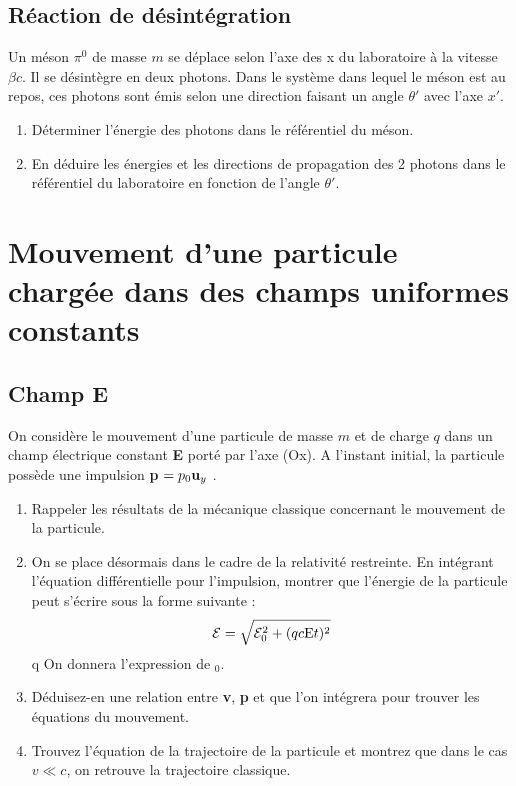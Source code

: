 \subsection{Réaction de désintégration}%
Un méson  $\pi^0$ de masse $m$ se déplace selon l’axe des x du laboratoire à la vitesse $\beta c$. Il se
désintègre en deux photons. Dans le système dans lequel le méson est au repos, ces photons
sont émis selon une direction faisant un angle $\theta'$ avec l’axe $x'$.
\begin{enumerate}
  \item Déterminer l’énergie des photons dans le référentiel du méson.
  \item En déduire les énergies et les directions de propagation des 2 photons dans le référentiel
du laboratoire en fonction de l’angle $\theta'$.
\end{enumerate}
\section{Mouvement d’une particule chargée dans des champs uniformes
constants}
\subsection{Champ E}%
On considère le mouvement d’une particule de masse $m$ et de charge $q$ dans un champ électrique
constant {\bf E} porté par l’axe (Ox). A l’instant initial, la particule possède une impulsion {\bf p} $= p_0{\bf u}_y$ .
\begin{enumerate}
  \item Rappeler les résultats de la mécanique classique concernant le mouvement de la particule.
  \item On se place désormais dans le cadre de la relativité restreinte. En intégrant l’équation
différentielle pour l’impulsion, montrer que l’énergie de la particule peut s’écrire sous la
forme suivante :
\[
\mathcal{E} = \sqrt{\mathcal{E}_0^2 + (qc\text{E}t)^2}
\]
q
On donnera l’expression de $_0$.
  \item Déduisez-en une relation entre {\bf v}, {\bf p} et  que l’on intégrera pour trouver les équations du
mouvement.
  \item Trouvez l’équation de la trajectoire de la particule et montrez que dans le cas $v \ll c$, on
retrouve la trajectoire classique.
\end{enumerate}
